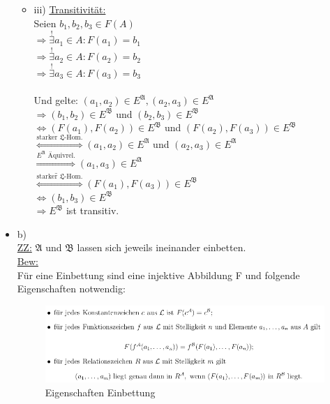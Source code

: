 \documentclass[a4paper]{scrartcl}
\begin{document}
\begin{itemize}
\begin{itemize}
\newpage

            \item iii) \underline{Transitivität:}\\
                Seien $b_1,b_2,b_3 \in F(A)$\\
                $\Rightarrow \overset{!}{\exists} a_1 \in A: F(a_1) = b_1$\\
                $\Rightarrow \overset{!}{\exists} a_2 \in A: F(a_2) = b_2$\\
                $\Rightarrow \overset{!}{\exists} a_3 \in A: F(a_3) = b_3$\\
                \\Und gelte: $(a_1,a_2) \in E^\mathfrak{A}, (a_2,a_3) \in E^\mathfrak{A}$\\
                $\Rightarrow (b_1,b_2) \in E^\mathfrak{B}$ und $(b_2,b_3) \in E^\mathfrak{B}$\\
                $\Leftrightarrow (F(a_1),F(a_2)) \in E^\mathfrak{B}$ und $(F(a_2),F(a_3)) \in E^\mathfrak{B}$\\
                $\overset{\text{starker }\mathfrak{L}\text{-Hom.}}{\Leftrightarrow} (a_1,a_2) \in E^\mathfrak{A}$ und $(a_2,a_3) \in E^\mathfrak{A}$\\
                $\overset{E^\mathfrak{A} \text{ Äquivrel.}}{ \underline{\Rightarrow}} (a_1,a_3)\in E^\mathfrak{A}$\\
                $\overset{\text{starker }\mathfrak{L}\text{-Hom.}}{\Leftrightarrow} (F(a_1),F(a_3)) \in E^\mathfrak{B}$\\
                $\Leftrightarrow (b_1,b_3) \in E^\mathfrak{B}$\\
                $\Rightarrow E^\mathfrak{B}$ ist transitiv.\\

        \end{itemize}
    \item b)\\
        \underline{ZZ:} $\mathfrak{A}$ und $\mathfrak{B}$ lassen sich jeweils ineinander einbetten.\\
        \underline{Bew:}\\
        Für eine Einbettung sind eine injektive Abbildung F und folgende Eigenschaften notwendig:\\

        \begin{figure}[H]
            \centering
            \includegraphics[scale=0.6]{Def-Einbettung.png}
            \caption{Eigenschaften Einbettung}
            \label{fig:}
        \end{figure}


\end{itemize}
\end{document}
